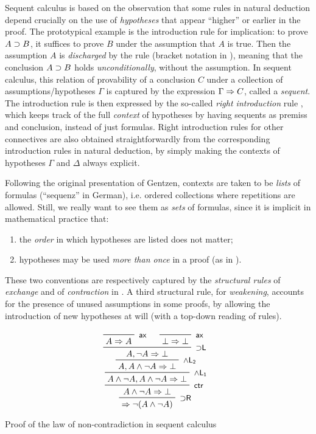 Sequent calculus is based on the observation that some rules in natural
deduction depend crucially on the use of \emph{hypotheses} that appear
``higher'' or earlier in the proof. The prototypical example is the introduction
rule  for implication: to prove $A \supset B$, it suffices to prove
$B$ under the assumption that $A$ is true. Then the assumption $A$ is
\emph{discharged} by the rule (bracket notation in ), meaning
that the conclusion $A \supset B$ holds \emph{unconditionally}, without the
assumption. In sequent calculus, this relation of provability of a conclusion
$C$ under a collection of assumptions/hypotheses $\Gamma$ is captured by the
expression $\Gamma \Rightarrow C$, called a \emph{sequent}. The introduction rule
 is then expressed by the so-called \emph{right introduction} rule
, which keeps track of the full \emph{context} of hypotheses by
having sequents as premiss and conclusion, instead of just formulas. Right
introduction rules for other connectives are also obtained straightforwardly
from the corresponding introduction rules in natural deduction, by simply making
the contexts of hypotheses $\Gamma$ and $\Delta$ always explicit.

Following the original presentation of Gentzen, contexts are taken to be
\emph{lists} of formulas (``sequenz'' in German), i.e. ordered collections where
repetitions are allowed. Still, we really want to see them as \emph{sets} of
formulas, since it is implicit in mathematical practice that:
\begin{enumerate}
\item the \emph{order} in which hypotheses are listed does not matter;
\item hypotheses may be used \emph{more than once} in a proof (as in
).
\end{enumerate}
These two conventions are respectively captured by the \emph{structural rules}
 of \emph{exchange} and  of \emph{contraction} in
. A third structural rule,  for \emph{weakening},
accounts for the presence of unused assumptions in some proofs, by allowing the
introduction of new hypotheses at will (with a top-down reading of rules).

\begin{marginfigure}
  $$
  \R[\rsf{{\limp} R}]
  {\R[\rsf{ctr}]
  {\R[\rsf{\land L_1}]
  {\R[\rsf{\land L_2}]
  {\R[\rsf{{\limp} L}]
    {\R[\rsf{ax}]
    {A \seq A}}
    {\R[\rsf{ax}]
    {\bot \seq \bot}}
    {A, \neg A \seq \bot}}
  {A, A \land \neg A \seq \bot}}
  {A \land \neg A, A \land \neg A \seq \bot}}
  {A \land \neg A \seq \bot}}
  {\seq \neg (A \land \neg A)}
  $$
  \caption{Proof of the law of non-contradiction in sequent calculus}
\end{marginfigure}

